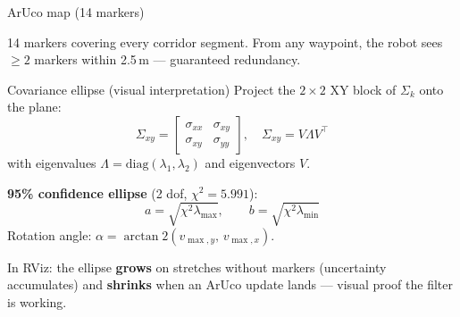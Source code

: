 \documentclass[10pt,aspectratio=169]{beamer}
\begin{document}
\begin{frame}{ArUco map (14 markers)}
  \centering
  \par\medskip
  \scriptsize 14 markers covering every corridor segment. From any waypoint,
  the robot sees $\geq 2$ markers within 2.5\,m — guaranteed redundancy.
\end{frame}

\begin{frame}{Covariance ellipse (visual interpretation)}
  Project the $2\times 2$ XY block of $\Sigma_k$ onto the plane:
  \[
    \Sigma_{xy} = \begin{bmatrix} \sigma_{xx} & \sigma_{xy} \\ \sigma_{xy} & \sigma_{yy}\end{bmatrix},
    \quad \Sigma_{xy} = V\Lambda V^\top
  \]
  with eigenvalues $\Lambda = \mathrm{diag}(\lambda_1, \lambda_2)$ and eigenvectors $V$.

  \medskip
  \textbf{95\% confidence ellipse} (2 dof, $\chi^2 = 5.991$):
  \[
    a = \sqrt{\chi^2 \lambda_{\max}}, \qquad b = \sqrt{\chi^2 \lambda_{\min}}
  \]
  Rotation angle: $\alpha = \arctan2(v_{\max,y},\, v_{\max,x})$.

  \medskip
  In RViz: the ellipse \textbf{grows} on stretches without markers
  (uncertainty accumulates) and \textbf{shrinks} when an ArUco update lands —
  visual proof the filter is working.
\end{frame}
\end{document}
